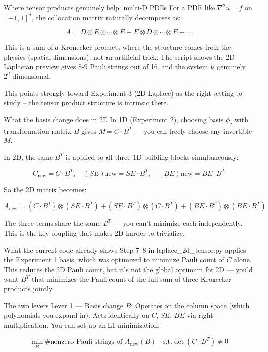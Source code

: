 \documentclass{article}
\begin{document}
Where tensor products genuinely help: multi-D PDEs
For a PDE like $\nabla^2 u = f$ on $[-1,1]^d$, the collocation matrix naturally decomposes as:

$$A = D \otimes E \otimes \cdots \otimes E + E \otimes D \otimes \cdots \otimes E + \cdots$$

This is a sum of $d$ Kronecker products where the structure comes from the physics (spatial dimensions), not an artificial trick. The script shows the 2D Laplacian preview gives 8-9 Pauli strings out of 16, and the system is genuinely $2^d$-dimensional.

This points strongly toward Experiment 3 (2D Laplace) as the right setting to study -- the tensor product structure is intrinsic there.




\noindent\makebox[\linewidth]{\rule{\paperwidth}{0.4pt}}


What the basis change does in 2D
In 1D (Experiment 2), choosing basis ${\phi_j}$ with transformation matrix $B$ gives $M = C \cdot B^T$ — you can freely choose any invertible $M$.

In 2D, the same $B^T$ is applied to all three 1D building blocks simultaneously:

$$C_\text{new} = C \cdot B^T, \quad (SE)\text{new} = SE \cdot B^T, \quad (BE)\text{new} = BE \cdot B^T$$

So the 2D matrix becomes:

$$A_\text{new} = (C \cdot B^T) \otimes (SE \cdot B^T) + (SE \cdot B^T) \otimes (C \cdot B^T) + (BE \cdot B^T) \otimes (BE \cdot B^T)$$

The three terms share the same $B^T$ — you can't minimize each independently. This is the key coupling that makes 2D harder to trivialize.

What the current code already shows
Step 7–8 in laplace_2d_tensor.py applies the Experiment 1 basis, which was optimized to minimize Pauli count of $C$ alone. This reduces the 2D Pauli count, but it's not the global optimum for 2D — you'd want $B^T$ that minimizes the Pauli count of the full sum of three Kronecker products jointly.

The two levers
Lever 1 — Basis change $B$: Operates on the column space (which polynomials you expand in). Acts identically on $C$, $SE$, $BE$ via right-multiplication. You can set up an L1 minimization:

$$\min_B \#{\text{nonzero Pauli strings of } A_\text{new}(B)} \quad \text{s.t.} \det(C \cdot B^T) \neq 0$$
\end{document}

